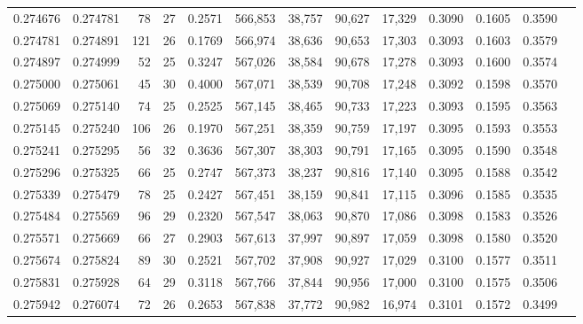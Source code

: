 \begin{tabular}{rrrrrrrrrrrrr}
0.274676 & 0.274781 &  78 &  27 &                                     0.2571 & 566,853 &  38,757 &  90,627 &  17,329 & 0.3090 & 0.1605 & 0.3590 \\
0.274781 & 0.274891 & 121 &  26 &                                     0.1769 & 566,974 &  38,636 &  90,653 &  17,303 & 0.3093 & 0.1603 & 0.3579 \\
0.274897 & 0.274999 &  52 &  25 &                                     0.3247 & 567,026 &  38,584 &  90,678 &  17,278 & 0.3093 & 0.1600 & 0.3574 \\
0.275000 & 0.275061 &  45 &  30 &                                     0.4000 & 567,071 &  38,539 &  90,708 &  17,248 & 0.3092 & 0.1598 & 0.3570 \\
0.275069 & 0.275140 &  74 &  25 &                                     0.2525 & 567,145 &  38,465 &  90,733 &  17,223 & 0.3093 & 0.1595 & 0.3563 \\
0.275145 & 0.275240 & 106 &  26 &                                     0.1970 & 567,251 &  38,359 &  90,759 &  17,197 & 0.3095 & 0.1593 & 0.3553 \\
0.275241 & 0.275295 &  56 &  32 &                                     0.3636 & 567,307 &  38,303 &  90,791 &  17,165 & 0.3095 & 0.1590 & 0.3548 \\
0.275296 & 0.275325 &  66 &  25 &                                     0.2747 & 567,373 &  38,237 &  90,816 &  17,140 & 0.3095 & 0.1588 & 0.3542 \\
0.275339 & 0.275479 &  78 &  25 &                                     0.2427 & 567,451 &  38,159 &  90,841 &  17,115 & 0.3096 & 0.1585 & 0.3535 \\
0.275484 & 0.275569 &  96 &  29 &                                     0.2320 & 567,547 &  38,063 &  90,870 &  17,086 & 0.3098 & 0.1583 & 0.3526 \\
0.275571 & 0.275669 &  66 &  27 &                                     0.2903 & 567,613 &  37,997 &  90,897 &  17,059 & 0.3098 & 0.1580 & 0.3520 \\
0.275674 & 0.275824 &  89 &  30 &                                     0.2521 & 567,702 &  37,908 &  90,927 &  17,029 & 0.3100 & 0.1577 & 0.3511 \\
0.275831 & 0.275928 &  64 &  29 &                                     0.3118 & 567,766 &  37,844 &  90,956 &  17,000 & 0.3100 & 0.1575 & 0.3506 \\
0.275942 & 0.276074 &  72 &  26 &                                     0.2653 & 567,838 &  37,772 &  90,982 &  16,974 & 0.3101 & 0.1572 & 0.3499 \\

\end{tabular}
